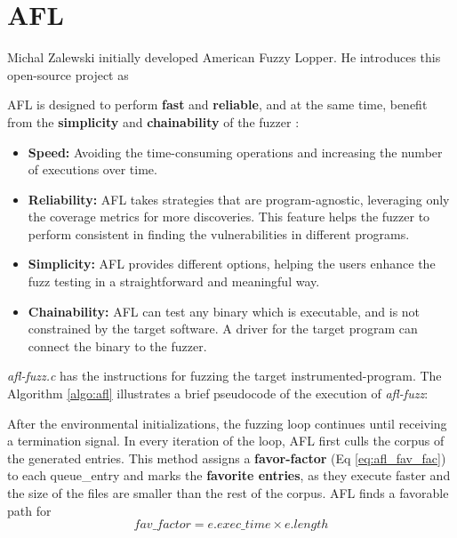 \section{AFL} \label{sec:2-afl}

Michal Zalewski initially developed American Fuzzy Lopper. He introduces this open-source project as  \cite{zalewski2014american}

AFL is designed to perform \textbf{fast} and \textbf{reliable}, and at the same time, benefit from the \textbf{simplicity} and \textbf{chainability} of the fuzzer \cite{about_afl}:

\begin{itemize}
    \item \textbf{Speed:} Avoiding the time-consuming operations and increasing the number of executions over time.
    \item \textbf{Reliability:} AFL takes strategies that are program-agnostic, leveraging only the coverage metrics for more discoveries. This feature helps the fuzzer to perform consistent in finding the vulnerabilities in different programs.
    \item \textbf{Simplicity:} AFL provides different options, helping the users enhance the fuzz testing in a straightforward and meaningful way. 
    \item \textbf{Chainability:} AFL can test any binary which is executable, and is not constrained by the target software. A driver for the target program can connect the binary to the fuzzer.
\end{itemize}

\textit{afl-fuzz.c} has the instructions for fuzzing the target instrumented-program. The Algorithm \ref{algo:afl} illustrates a brief pseudocode of the execution of \textit{afl-fuzz}:



After the environmental initializations, the fuzzing loop continues until receiving a termination signal. In every iteration of the loop, AFL first culls the corpus of the generated entries. This method assigns a \textbf{favor-factor} (Eq \ref{eq:afl_fav_fac}) to each queue\_entry and marks the \textbf{favorite entries}, as they execute faster and the size of the files are smaller than the rest of the corpus. AFL finds a favorable path for  \cite{afl_git} 
\begin{equation}
    fav\_factor = e.exec\_time \times e.length
    \label{eq:afl_fav_fac}
\end{equation}

